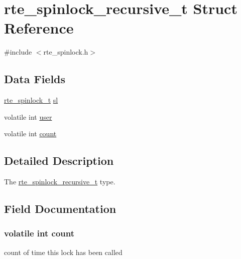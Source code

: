 \hypertarget{structrte__spinlock__recursive__t}{}\section{rte\+\_\+spinlock\+\_\+recursive\+\_\+t Struct Reference}
\label{structrte__spinlock__recursive__t}


{\ttfamily \#include $<$rte\+\_\+spinlock.\+h$>$}

\subsection*{Data Fields}
\begin{DoxyCompactItemize}
\item 
\hyperlink{structrte__spinlock__t}{rte\+\_\+spinlock\+\_\+t} \hyperlink{structrte__spinlock__recursive__t_afbea098cf5a01b98d8f3b58939aa4f49}{sl}
\item 
volatile int \hyperlink{structrte__spinlock__recursive__t_a6c93cf1369e3cef58d8c4a5162272c76}{user}
\item 
volatile int \hyperlink{structrte__spinlock__recursive__t_ab2caed1cbe66b4adb794da880e147fdc}{count}
\end{DoxyCompactItemize}


\subsection{Detailed Description}
The \hyperlink{structrte__spinlock__recursive__t}{rte\+\_\+spinlock\+\_\+recursive\+\_\+t} type. 

\subsection{Field Documentation}
\hypertarget{structrte__spinlock__recursive__t_ab2caed1cbe66b4adb794da880e147fdc}{}
\subsubsection[{count}]{\setlength{\rightskip}{0pt plus 5cm}volatile int count}\label{structrte__spinlock__recursive__t_ab2caed1cbe66b4adb794da880e147fdc}
count of time this lock has been called \hypertarget{structrte__spinlock__recursive__t_afbea098cf5a01b98d8f3b58939aa4f49}{}
